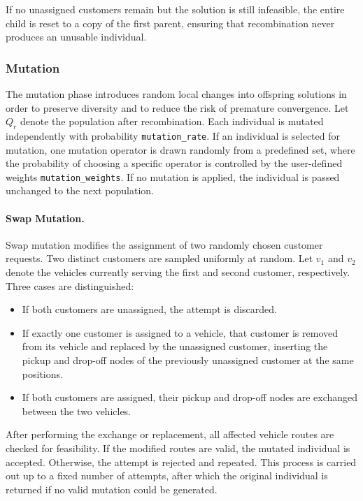 \documentclass[12pt]{article}
\begin{document}
If no unassigned customers remain but the solution is still infeasible, the entire child is reset to a copy of the first parent, ensuring that recombination never produces an unusable individual.


\subsubsection{Mutation}

The mutation phase introduces random local changes into offspring solutions in order to preserve diversity and to reduce the risk of premature convergence. Let $Q_r$ denote the population after recombination. Each individual is mutated independently with probability \texttt{mutation\_rate}. If an individual is selected for mutation, one mutation operator is drawn randomly from a predefined set, where the probability of choosing a specific operator is controlled by the user-defined weights \texttt{mutation\_weights}. If no mutation is applied, the individual is passed unchanged to the next population.

\paragraph{Swap Mutation.}
Swap mutation modifies the assignment of two randomly chosen customer requests. Two distinct customers are sampled uniformly at random. Let $v_1$ and $v_2$ denote the vehicles currently serving the first and second customer, respectively. Three cases are distinguished:

\begin{itemize}
\item If both customers are unassigned, the attempt is discarded.
\item If exactly one customer is assigned to a vehicle, that customer is removed from its vehicle and replaced by the unassigned customer, inserting the pickup and drop-off nodes of the previously unassigned customer at the same positions.
\item If both customers are assigned, their pickup and drop-off nodes are exchanged between the two vehicles.
\end{itemize}

After performing the exchange or replacement, all affected vehicle routes are checked for feasibility. If the modified routes are valid, the mutated individual is accepted. Otherwise, the attempt is rejected and repeated. This process is carried out up to a fixed number of attempts, after which the original individual is returned if no valid mutation could be generated.
\end{document}
